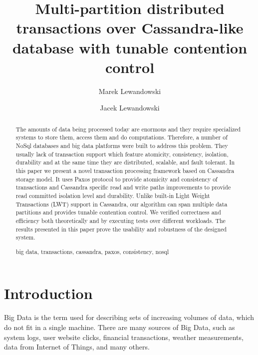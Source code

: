 \documentclass[runningheads,a4paper]{llncs}
\newcommand{\keywords}[1]{\par\addvspace\baselineskip
\noindent\keywordname\enspace\ignorespaces#1}
\begin{document}
\mainmatter

\title{Multi-partition distributed transactions over Cassandra-like database with tunable contention control}

\author{Marek Lewandowski \and Jacek Lewandowski}


\maketitle

\begin{abstract}
The amounts of data being processed today are enormous and they require specialized systems 
to store them, access them and do computations. Therefore, a number of NoSql databases and 
big data platforms were built to address this problem. They usually lack of transaction 
support which feature atomicity, consistency, isolation, durability and at the same time 
they are distributed, scalable, and fault tolerant. In this paper we present a novel 
transaction processing framework based on Cassandra storage model. It uses Paxos protocol 
to provide atomicity and consistency of transactions and Cassandra specific read and write 
paths improvements to provide read committed isolation level and durability. Unlike built-in 
Light Weight Transactions (LWT) support in Cassandra, our algorithm can span multiple data 
partitions and provides tunable contention control. We verified correctness and efficiency 
both theoretically and by executing tests over different workloads. The results presented 
in this paper prove the usability and robustness of the designed system. 
\keywords{big data, transactions, cassandra, paxos, consistency, nosql}
\end{abstract}

\section{Introduction}
Big Data is the term used for describing sets of increasing volumes of data, which do not fit 
in a single machine. There are many sources of Big Data, such as system logs, user website 
clicks, financial transactions, weather measurements, data from Internet of Things, and many others.
\end{document}
